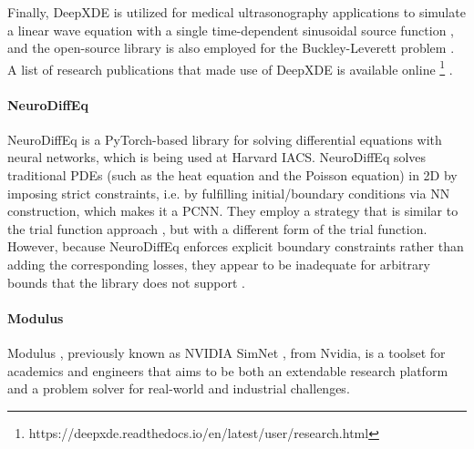 \documentclass[pdflatex,sn-basic]{sn-jnl}%
\theoremstyle{thmstyleone}%
\theoremstyle{thmstyletwo}%
\theoremstyle{thmstylethree}%
\begin{document}
Finally, DeepXDE is utilized for medical ultrasonography applications to simulate a linear wave equation with a single time-dependent sinusoidal source function \citep{Alk2021_ModelingForwardWave_LiuALA},
and the open-source library is also employed for the Buckley-Leverett problem 
\citep{Alm2022_PredictionPorousMedia_AbuAA}.
%
%
A list of research publications that made use of DeepXDE is available online
\footnote{https://deepxde.readthedocs.io/en/latest/user/research.html}
.



\paragraph{NeuroDiffEq} %

NeuroDiffEq \citep{chen2020neurodiffeq} is a PyTorch-based library for solving differential equations with neural networks, which is being used at Harvard IACS. 
NeuroDiffEq solves traditional PDEs (such as the heat equation and the Poisson equation) in 2D by imposing strict constraints, i.e. by fulfilling initial/boundary conditions via NN construction, which makes it a PCNN.
They employ a strategy that is similar to the trial function approach \citep{Lag1998_ArtificialNeuralNetworks_LikLLF}, but with a different form of the trial function. 
%
However, because NeuroDiffEq enforces explicit boundary constraints rather than adding the corresponding losses, they appear to be inadequate for arbitrary bounds that the library does not support \citep{Bal2021_DistributedMultigridNeural_BotBBK}. 







\paragraph{Modulus} %
Modulus \citep{Modulus2021}, previously known as NVIDIA SimNet  \citep{Hen2021_NvidiaSimnetAi_NarHNN}, from Nvidia, is a toolset for academics and engineers that aims to be both an extendable research platform and a problem solver for real-world and industrial challenges.
\end{document}
